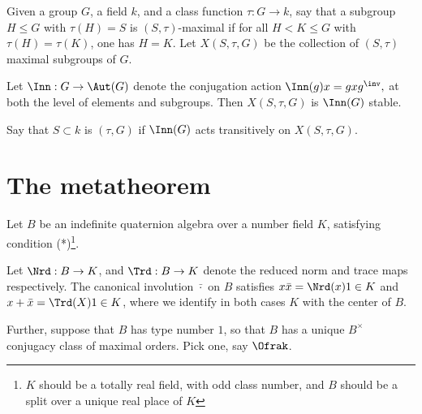 
Given a group $G$, a field $k$, and a class function $\tau : G \to k$, say that a subgroup $H\leq G$ with $\tau(H) = S$ is $(S,\tau)$-maximal if for all $H < K \leq G$ with $\tau(H) = \tau(K)$, one has $H = K$. Let $X(S, \tau, G) $ be the collection of $(S, \tau)$ maximal subgroups of $G$.

Let $\Inn:G \to \Aut(G)$ denote the conjugation action $\Inn(g)x = g x g^\inv,$ at both the level of elements and subgroups. Then $X(S, \tau, G)$ is $\Inn(G)$ stable. 

Say that $S\subset k$ is $(\tau, G)$ if $\Inn(G)$ acts transitively on $X(S, \tau, G)$. 

\section{The metatheorem}

Let $B$ be an indefinite quaternion algebra over a number field $K$, satisfying condition  (*)\footnote{$K$ should be  a totally real field, with odd class number, and $B$ should be a split over a unique real place of $K$}. 

Let $\Nrd: B\to K$, and $\Trd: B \to K$ denote the reduced norm and trace maps respectively. The canonical involution $\bar{\cdot}$ on $B$ satisfies $x\bar{x} = \Nrd(x) 1 \in K$ and  $x+\bar{x} = \Trd(X) 1 \in K$, where we identify in both cases $K$ with the center of $B$. 

Further, suppose that $B$ has type number $1$, so that $B$ has a unique $B^\times$ conjugacy class of maximal orders. Pick one, say $\Ofrak$. 


